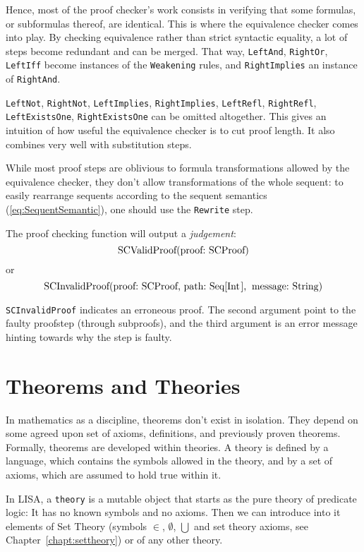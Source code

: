 Hence, most of the proof checker's work consists in verifying that some formulas, or subformulas thereof, are identical. This is where the equivalence checker comes into play. By checking equivalence rather than strict syntactic equality, a lot of steps become redundant and can be merged. That way, \texttt{LeftAnd}, \texttt{RightOr}, \texttt{LeftIff} become instances of the \texttt{Weakening} rules, and \texttt{RightImplies} an instance of \texttt{RightAnd}.

\texttt{LeftNot}, \texttt{RightNot}, \texttt{LeftImplies}, \texttt{RightImplies}, \texttt{LeftRefl}, \texttt{RightRefl}, \texttt{LeftExistsOne},  \texttt{RightExistsOne}  can be omitted altogether. This gives an intuition of how useful the equivalence checker is to cut proof length. It also combines very well with substitution steps.

While most proof steps are oblivious to formula transformations allowed by the equivalence checker, they don't allow transformations of the whole sequent: to easily rearrange sequents according to the sequent semantics (\ref{eq:SequentSemantic}), one should use the \texttt{Rewrite} step.

The proof checking function will output a \textit{judgement}:
$$
  \text{\lstinline{SCValidProof(proof: SCProof)}}
$$
or
$$
  \text{\lstinline{SCInvalidProof(proof: SCProof, path: Seq[Int], message: String)}}
$$

\lstinline{SCInvalidProof}{} indicates an erroneous proof. The second argument point to the faulty proofstep (through subproofs), and the third argument is an error message hinting towards why the step is faulty.


\section{Theorems and Theories}
\label{sect:TheoremsAndTheories}

In mathematics as a discipline, theorems don't exist in isolation. They depend on some agreed upon set of axioms, definitions, and previously proven theorems. Formally, theorems are developed within theories. A theory is defined by a language, which contains the symbols allowed in the theory, and by a set of axioms, which are assumed to hold true within it.

In LISA, a \lstinline{theory}{} is a mutable object that starts as the pure theory of predicate logic: It has no known symbols and no axioms. Then we can introduce into it elements of Set Theory (symbols $\in$, $\emptyset$, $\bigcup$ and set theory axioms, see Chapter~\ref{chapt:settheory}) or of any other theory.

